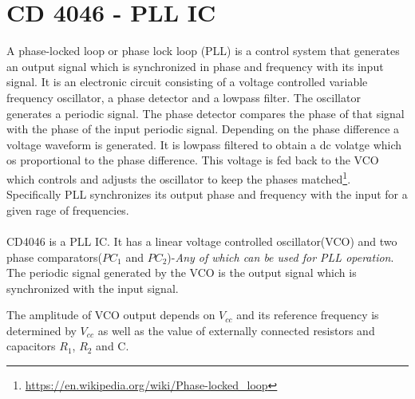 \section{CD 4046 - PLL IC}
\label{4046}
A phase-locked loop or phase lock loop (PLL) is a control system that generates an output signal which is synchronized in phase and frequency with its input signal. It is an electronic circuit consisting of a voltage controlled variable frequency oscillator, a phase detector and a lowpass filter. The oscillator generates a periodic signal. The phase detector compares the phase of that signal with the phase of the input periodic signal. Depending on the phase difference a voltage waveform is generated. It is lowpass filtered to obtain a dc volatge which os proportional to the phase difference. This voltage is fed back to the VCO which controls and adjusts the oscillator to keep the phases matched\footnote{\url{https://en.wikipedia.org/wiki/Phase-locked_loop}}. Specifically PLL synchronizes its output phase and frequency with the input for a given rage of frequencies.

\paragraph{}


CD4046 is a PLL IC. It has a linear voltage controlled oscillator(VCO) and two phase comparators($PC_1$ and $PC_2$)-\emph{Any of which can be used for PLL operation}. The periodic signal generated by the VCO is the output signal which is synchronized with the input signal. 

The amplitude of VCO output depends on $V_{cc}$ and its reference frequency is determined by $V_{cc}$ as well as the value of externally connected resistors and capacitors $R_1$, $R_2$ and C. 


